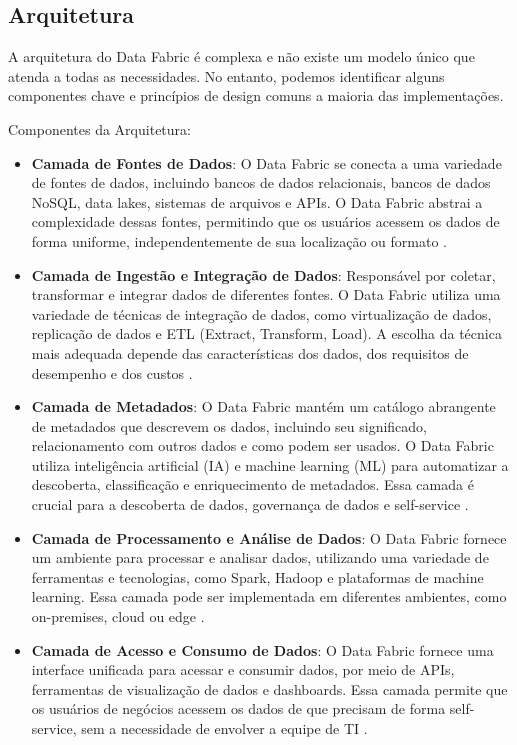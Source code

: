 \subsection{Arquitetura}
A arquitetura do Data Fabric é complexa e não existe um modelo único que atenda a todas as necessidades. No entanto, podemos identificar alguns componentes chave 
e princípios de design comuns a maioria das implementações.

Componentes da Arquitetura:
\begin{itemize}
    \item \textbf{Camada de Fontes de Dados}: O Data Fabric se conecta a uma variedade de fontes de dados, incluindo bancos de dados relacionais, bancos de dados NoSQL, data lakes, sistemas de arquivos e APIs. O Data Fabric abstrai a complexidade dessas fontes, permitindo que os usuários acessem os dados de forma uniforme, independentemente de sua localização ou formato \cite{barik2022data}.
    \item \textbf{Camada de Ingestão e Integração de Dados}: Responsável por coletar, transformar e integrar dados de diferentes fontes. O Data Fabric utiliza uma variedade de técnicas de integração de dados, como virtualização de dados, replicação de dados e ETL (Extract, Transform, Load). A escolha da técnica mais adequada depende das características dos dados, dos requisitos de desempenho e dos custos \cite{barik2022data}.
    \item \textbf{Camada de Metadados}: O Data Fabric mantém um catálogo abrangente de metadados que descrevem os dados, incluindo seu significado, relacionamento com outros dados e como podem ser usados. O Data Fabric utiliza inteligência artificial (IA) e machine learning (ML) para automatizar a descoberta, classificação e enriquecimento de metadados. Essa camada é crucial para a descoberta de dados, governança de dados e self-service \cite{barik2022data}.
    \item \textbf{Camada de Processamento e Análise de Dados}: O Data Fabric fornece um ambiente para processar e analisar dados, utilizando uma variedade de ferramentas e tecnologias, como Spark, Hadoop e plataformas de machine learning. Essa camada pode ser implementada em diferentes ambientes, como on-premises, cloud ou edge \cite{sharma2023data}.
    \item \textbf{Camada de Acesso e Consumo de Dados}: O Data Fabric fornece uma interface unificada para acessar e consumir dados, por meio de APIs, ferramentas de visualização de dados e dashboards. Essa camada permite que os usuários de negócios acessem os dados de que precisam de forma self-service, sem a necessidade de envolver a equipe de TI \cite{barik2022data}.
\end{itemize}

